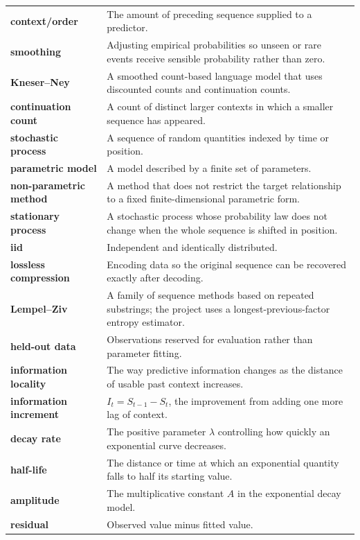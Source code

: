 \documentclass[11pt]{article}
\begin{document}
\begin{longtable}{p{}p{}}
\textbf{context/order} & The amount of preceding sequence supplied to a predictor.\\
\textbf{smoothing} & Adjusting empirical probabilities so unseen or rare events receive sensible probability rather than zero.\\
\textbf{Kneser--Ney} & A smoothed count-based language model that uses discounted counts and continuation counts.\\
\textbf{continuation count} & A count of distinct larger contexts in which a smaller sequence has appeared.\\
\textbf{stochastic process} & A sequence of random quantities indexed by time or position.\\
\textbf{parametric model} & A model described by a finite set of parameters.\\
\textbf{non-parametric method} & A method that does not restrict the target relationship to a fixed finite-dimensional parametric form.\\
\textbf{stationary process} & A stochastic process whose probability law does not change when the whole sequence is shifted in position.\\
\textbf{iid} & Independent and identically distributed.\\
\textbf{lossless compression} & Encoding data so the original sequence can be recovered exactly after decoding.\\
\textbf{Lempel--Ziv} & A family of sequence methods based on repeated substrings; the project uses a longest-previous-factor entropy estimator.\\
\textbf{held-out data} & Observations reserved for evaluation rather than parameter fitting.\\
\textbf{information locality} & The way predictive information changes as the distance of usable past context increases.\\
\textbf{information increment} & $I_t=S_{t-1}-S_t$, the improvement from adding one more lag of context.\\
\textbf{decay rate} & The positive parameter $\lambda$ controlling how quickly an exponential curve decreases.\\
\textbf{half-life} & The distance or time at which an exponential quantity falls to half its starting value.\\
\textbf{amplitude} & The multiplicative constant $A$ in the exponential decay model.\\
\textbf{residual} & Observed value minus fitted value.\\

\end{longtable}
\end{document}
